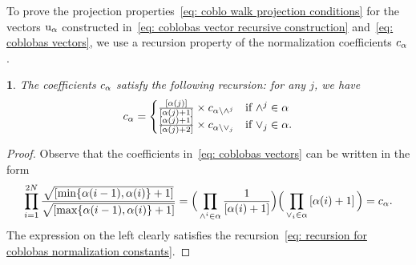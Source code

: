 \documentclass[oneside,english]{amsart}
\numberwithin{equation}{section}
\numberwithin{figure}{section}
\theoremstyle{plain}
\theoremstyle{plain}
\theoremstyle{plain}
\newtheorem{lem}{\protect\lemmaname}
\theoremstyle{remark}
\theoremstyle{plain}
\theoremstyle{plain}
\theoremstyle{plain}
\theoremstyle{plain}
\theoremstyle{plain}
\theoremstyle{plain}
\theoremstyle{plain}
\theoremstyle{plain}
\providecommand{\lemmaname}{Lemma}
\begin{document}
To prove the projection properties~\eqref{eq: coblo walk projection conditions}
for the vectors $\mathrm{u}_\alpha$ %
constructed in~\eqref{eq: coblobas vector recursive construction}
and~\eqref{eq: coblobas vectors},
we use a recursion property of the normalization coefficients
$c_\alpha$. %

\begin{lem}\label{lem: recursion for normalization constants}
The coefficients $c_\alpha$ satisfy the %
following recursion: for any $j$, we have
\begin{align}\label{eq: recursion for coblobas normalization constants}
\NormalizationConstant_\alpha= \begin{cases}
\frac{\qnum{\alpha(j)}}{\qnum{\alpha(j)+1}} \times
 \NormalizationConstant_{\alpha \removeupwedge{j}} & \text{if } \upwedgeat{j} \in \alpha \\ %
\frac{\qnum{\alpha(j)+1}}{\qnum{\alpha(j)+2}}\times
 \NormalizationConstant_{\alpha \removedownwedge{j}} & \text{if } \downwedgeat{j} \in \alpha . %
\end{cases}
\end{align}
\end{lem}
\begin{proof}
Observe that the coefficients in~\eqref{eq: coblobas vectors} can be written in the form
\begin{align*}%
\prod_{i=1}^{2N} \frac{\sqrt{\qnum{\min\{\alpha(i-1),\alpha(i)\} + 1}}}{\sqrt{\qnum{\max\{\alpha(i-1),\alpha(i)\} + 1}}}
= \Big( \prod_{\upwedgeat{i} \in \alpha} \frac{1}{\qnum{\alpha(i)+1}} \Big)
\Big( \prod_{\downwedgeat{i} \in \alpha} \qnum{\alpha(i)+1} \Big) = \NormalizationConstant_\alpha.
\end{align*}
The expression on the left clearly satisfies 
the recursion~\eqref{eq: recursion for coblobas normalization constants}.
\end{proof}
\end{document}
